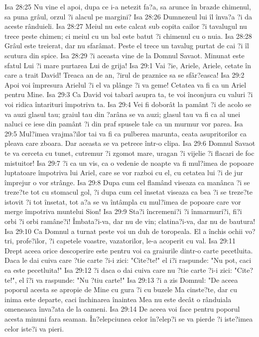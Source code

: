 Isa 28:25  Nu vine el apoi, dupa ce i-a netezit fa?a, sa arunce în brazde chimenul, sa puna grâul, orzul ?i alacul pe margini?
Isa 28:26  Dumnezeul lui îl înva?a ?i da aceste rânduieli.
Isa 28:27  Meiul nu este calcat sub copita cailor ?i tavalugul nu trece peste chimen; ci meiul cu un bal este batut ?i chimenul cu o nuia.
Isa 28:28  Grâul este treierat, dar nu sfarâmat. Peste el trece un tavalug purtat de cai ?i îl scutura din spice.
Isa 28:29  ?i aceasta vine de la Domnul Savaot. Minunat este sfatul Lui ?i mare purtarea Lui de grija!
Isa 29:1  Vai ?ie, Ariele, Ariele, cetate în care a trait David! Treaca an de an, ?irul de praznice sa se sfâr?easca!
Isa 29:2  Apoi voi împresura Arielul ?i el va plânge ?i va geme! Cetatea va fi ca un Ariel pentru Mine.
Isa 29:3  Ca David voi tabarî asupra ta, te voi înconjura cu valuri ?i voi ridica întarituri împotriva ta.
Isa 29:4  Vei fi doborât la pamânt ?i de acolo se va auzi glasul tau; graiul tau din ?arâna se va auzi; glasul tau va fi ca al unei naluci ce iese din pamânt ?i din praf spusele tale ca un murmur vor parea.
Isa 29:5  Mul?imea vrajma?ilor tai va fi ca pulberea marunta, ceata asupritorilor ca pleava care zboara. Dar aceasta se va petrece într-o clipa.
Isa 29:6  Domnul Savaot te va cerceta cu tunet, cutremur ?i zgomot mare, uragan ?i vijelie ?i flacari de foc mistuitor!
Isa 29:7  ?i ca un vis, ca o vedenie de noapte va fi mul?imea de popoare luptatoare împotriva lui Ariel, care se vor razboi cu el, cu cetatea lui ?i de jur împrejur o vor strânge.
Isa 29:8  Dupa cum cel flamând viseaza ca manânca ?i se treze?te tot cu stomacul gol, ?i dupa cum cel însetat viseaza ca bea ?i se treze?te istovit ?i tot însetat, tot a?a se va întâmpla cu mul?imea de popoare care vor merge împotriva muntelui Sion!
Isa 29:9  Sta?i încremeni?i ?i înmarmuri?i, fi?i orbi ?i orbi ramâne?i! Îmbata?i-va, dar nu de vin; clatina?i-va, dar nu de bautura!
Isa 29:10  Ca Domnul a turnat peste voi un duh de toropeala. El a închis ochii vo?tri, profe?ilor, ?i capetele voastre, vazatorilor, le-a acoperit cu val.
Isa 29:11  Drept aceea orice descoperire este pentru voi ca graiurile dintr-o carte pecetluita. Daca le dai cuiva care ?tie carte ?i-i zici: "Cite?te!" el i?i raspunde: "Nu pot, caci ea este pecetluita!"
Isa 29:12  ?i daca o dai cuiva care nu ?tie carte ?i-i zici: "Cite?te!", el î?i va raspunde: "Nu ?tiu carte!"
Isa 29:13  ?i a zis Domnul: "De aceea poporul acesta se apropie de Mine cu gura ?i cu buzele Ma cinste?te, dar cu inima este departe, caci închinarea înaintea Mea nu este decât o rânduiala omeneasca înva?ata de la oameni.
Isa 29:14  De aceea voi face pentru poporul acesta minuni fara seaman. În?elepciunea celor în?elep?i se va pierde ?i iste?imea celor iste?i va pieri.

